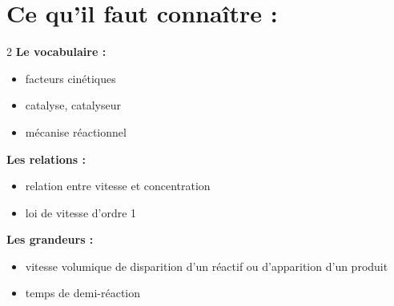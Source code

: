 \documentclass[a4paper,11pt,fleqn]{article}%
\begin{document}
\maketitle

\section*{Ce qu'il faut connaître :}

\begin{multicols}{2}
\textbf{Le vocabulaire :}
\begin{itemize}
    \item facteurs cinétiques
    \item catalyse, catalyseur
    \item mécanise réactionnel
\end{itemize}
\columnbreak
\textbf{Les relations :}
\begin{itemize}
    \item relation entre vitesse et concentration
    \item loi de vitesse d'ordre 1
\end{itemize}
\textbf{Les grandeurs :}
\begin{itemize}
    \item vitesse volumique de disparition d'un réactif ou d'apparition d'un produit
    \item temps de demi-réaction
\end{itemize}
\end{multicols}
\end{document}
